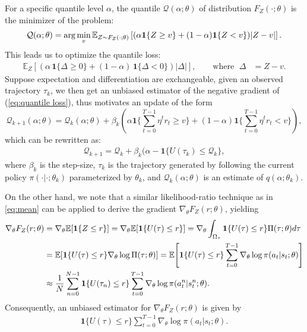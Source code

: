 For a specific quantile level $\alpha$, the quantile $\mathcal{Q}(\alpha;\theta)$ of distribution $F_{Z}(\cdot;\theta)$ is the minimizer of the problem:
\begin{align}
    \notag
    \mathcal{Q}(\alpha;\theta)=\arg\min_{v}\mathbb{E}_{Z\sim F_{Z}(\cdot;\theta)}\left[(\alpha\mathbf{1}\{Z\geq v\}+(1-\alpha)\mathbf{1}\{Z<v\})|Z-v|\right].
\end{align}
This leads us to optimize the quantile loss:
\begin{align}\label{eq:quantile loss}
\mathbb{E}_{Z}\!\left[\left(\alpha\,\mathbf{1}\{\Delta \ge 0\}+(1-\alpha)\,\mathbf{1}\{\Delta<0\}\right)|\Delta|\right],
\qquad \text{where }\;
\Delta &= Z - v .
\end{align}
Suppose expectation and differentiation are exchangeable, given an observed trajectory $\tau_k$, we then get an unbiased estimator of the negative gradient of (\ref{eq:quantile loss}), thus motivates an update of the form
$$
\mathcal{Q}_{k+1}(\alpha;\theta) = \mathcal{Q}_{k}(\alpha;\theta) + \beta_{k}\left(\alpha\mathbf{1}\{\sum_{t=0}^{T-1}\eta^t r_t\geq v\}+(1-\alpha)\mathbf{1}\{\sum_{t=0}^{T-1}\eta^t r_t<v\}\right),
$$
which can be rewritten as:
\begin{align} \label{quantile update}
    \mathcal{Q}_{k+1}=\mathcal{Q}_k + \beta_k(\alpha-\mathbf{1}\{U(\tau_k)\leq \mathcal{Q}_k\},
\end{align}
where $\beta_k$ is the step-size, $\tau_k$ is the trajectory generated by following the current policy $\pi(\cdot|\cdot;\theta_k)$ parameterized by $\theta_k$, and $\mathcal{Q}_k(\alpha;\theta)$ is an estimate of $q(\alpha;\theta_k)$.

On the other hand, we note that a similar likelihood-ratio technique as in \ref{eq:mean} can be applied to derive the gradient $\nabla_\theta F_Z(r;\theta)$, yielding
\begin{align} \notag
\nabla_\theta F_Z(r;\theta) 
&= \nabla_\theta \mathbb{E}[ \mathbf{1}\{ Z \le r \} ] 
= \nabla_\theta \mathbb{E}[ \mathbf{1}\{ U(\tau) \le r \} ] 
= \nabla_\theta \int_{\Omega_\tau} \mathbf{1}\{ U(\tau) \le r \} \Pi(\tau;\theta) d\tau \notag \\
&= \mathbb{E}\!\left[ \mathbf{1}\{ U(\tau) \le r \} \nabla_\theta \log \Pi(\tau;\theta) \right]
= \mathbb{E}\!\left[ \mathbf{1}\{ U(\tau) \le r \} \sum_{t=0}^{T-1} \nabla_\theta \log \pi(a_t|s_t;\theta) \right] \notag \\
&\approx \frac{1}{N} \sum_{n=0}^{N-1} \mathbf{1}\{ U(\tau_n) \le r \} 
\sum_{t=0}^{T-1} \nabla_\theta \log \pi(a_t^n|s_t^n;\theta). \notag
\end{align}
Consequently, an unbiased estimator for $\nabla_{\theta}F_{Z}(r;\theta)$ is given by
\begin{align} \label{eq:quantile_grad}
    \mathbf{1}\{U(\tau)\leq r\}\sum_{t=0}^{T-1}\nabla_{\theta}\log\pi(a_t|s_t;\theta).
\end{align}

